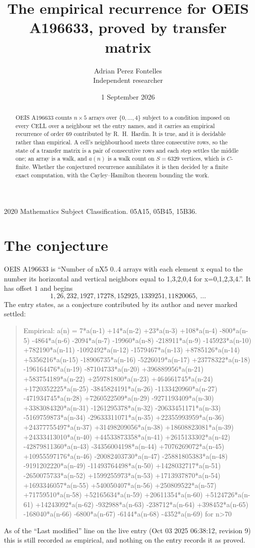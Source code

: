 \documentclass[11pt,a4paper]{article}
\title{The empirical recurrence for OEIS A196633, proved by transfer matrix}
\author{Adrian Perez Fontelles\\ \small Independent researcher}
\date{1 September 2026}
\theoremstyle{plain}
\theoremstyle{definition}
\begin{document}
\maketitle

\begin{abstract}
OEIS A196633 counts $n\times5$ arrays over $\{0,\dots,4\}$ subject to a condition imposed on
every CELL over a neighbour set the entry names, and it carries an empirical recurrence of
order $69$ contributed by R.~H.~Hardin. It is true, and it is decidable rather than
empirical. A cell's neighbourhood meets three consecutive rows, so the state of a transfer
matrix is a pair of consecutive rows and each step settles the middle one; an array is a
walk, and $a(n)$ is a walk count on $S=6329$ vertices, which is $C$-finite. Whether the
conjectured recurrence annihilates it is then decided by a finite exact computation, with the
Cayley--Hamilton theorem bounding the work.
\end{abstract}

\noindent\small 2020 Mathematics Subject Classification. 05A15, 05B45, 15B36.\normalsize

\section{The conjecture}

OEIS A196633 is ``Number of nX5 0..4 arrays with each element x equal to the number its horizontal and vertical neighbors equal to 1,3,2,0,4 for x=0,1,2,3,4.''. It has offset $1$ and begins
\[
1, 26, 232, 1927, 17278, 152925, 1339251, 11820065,\ \dots
\]
The entry states, as a conjecture contributed by its author and never marked settled:
\begin{quote}
Empirical: a(n) = 7*a(n-1) +14*a(n-2) +23*a(n-3) +108*a(n-4) -800*a(n-5) -4864*a(n-6) -2094*a(n-7) -19960*a(n-8) -218911*a(n-9) -145923*a(n-10) +782190*a(n-11) -1092492*a(n-12) -1579467*a(n-13) +8785126*a(n-14) +5356216*a(n-15) -18906735*a(n-16) -5226019*a(n-17) +23778322*a(n-18) -196164476*a(n-19) -87104733*a(n-20) +396889956*a(n-21) +583754189*a(n-22) +259781800*a(n-23) +464661745*a(n-24) +1720352225*a(n-25) -3845824191*a(n-26) -1133420960*a(n-27) -471934745*a(n-28) +7260522509*a(n-29) -9271193409*a(n-30) +3383084320*a(n-31) -1261295378*a(n-32) -20633451171*a(n-33) -5169759873*a(n-34) -29633311071*a(n-35) +22355993959*a(n-36) +24377755497*a(n-37) +31498209056*a(n-38) +18608823081*a(n-39) +24333413010*a(n-40) +44533873358*a(n-41) +2615133302*a(n-42) -42879811360*a(n-43) -34356004198*a(n-44) +7076269072*a(n-45) +10955597176*a(n-46) -20082403730*a(n-47) -25881805383*a(n-48) -9191202220*a(n-49) -11493764498*a(n-50) +1428032717*a(n-51) -2650075733*a(n-52) +1599255973*a(n-53) +1713937870*a(n-54) +1693346057*a(n-55) +540050407*a(n-56) +250809522*a(n-57) +71759510*a(n-58) +52165634*a(n-59) +20611354*a(n-60) +5124726*a(n-61) +14243092*a(n-62) -932988*a(n-63) -238712*a(n-64) +398452*a(n-65) -168040*a(n-66) -6800*a(n-67) -6144*a(n-68) -4352*a(n-69) for n>70
\end{quote}
As of the ``Last modified'' line on the live entry (Oct 03 2025 06:38:12, revision 9) this is still
recorded as empirical, and nothing on the entry records it as proved.
\end{document}
